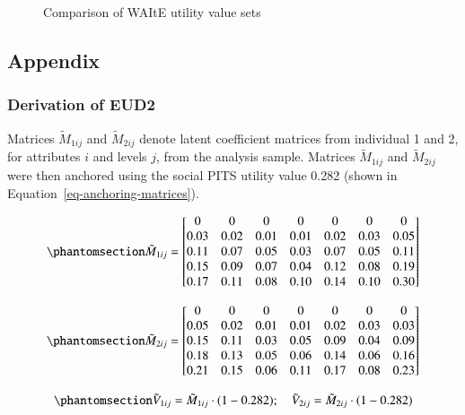\documentclass[
  number,
  preprint]{elsarticle}
\begin{document}
\begin{figure}
{}

\caption{\label{fig-WAItEvalsets}Comparison of WAItE utility value sets}

\end{figure}%

\subsection{Appendix}\label{appendix}

\subsubsection{Derivation of EUD2}\label{sec-appendix1}

Matrices \(\tilde{M}_{1ij}\) and \(\tilde{M}_{2ij}\) denote latent
coefficient matrices from individual 1 and 2, for attributes \(i\) and
levels \(j\), from the analysis sample. Matrices \(\tilde{M}_{1ij}\) and
\(\tilde{M}_{2ij}\) were then anchored using the social PITS utility
value 0.282 (shown in Equation~\ref{eq-anchoring-matrices}).

\begin{equation}\phantomsection\label{eq-coef-1}{
\tilde{M}_{1ij} =  
\begin{bmatrix}
0 & 0 & 0 & 0 & 0 & 0 & 0 \\
0.03 & 0.02 & 0.01 & 0.01 & 0.02 & 0.03 & 0.05 \\
0.11 & 0.07 & 0.05 & 0.03 & 0.07 & 0.05 & 0.11 \\
0.15 & 0.09 & 0.07 & 0.04 & 0.12 & 0.08 & 0.19 \\
0.17 & 0.11 & 0.08 & 0.10 & 0.14 & 0.10 & 0.30
\end{bmatrix}
}\end{equation}

\begin{equation}\phantomsection\label{eq-coef-2}{
\tilde{M}_{2ij} =  
\begin{bmatrix}
0 & 0 & 0 & 0 & 0 & 0 & 0 \\
0.05 & 0.02 & 0.01 & 0.01 & 0.02 & 0.03 & 0.03 \\
0.15 & 0.11 & 0.03 & 0.05 & 0.09 & 0.04 & 0.09 \\
0.18 & 0.13 & 0.05 & 0.06 & 0.14 & 0.06 & 0.16 \\
0.21 & 0.15 & 0.06 & 0.11 & 0.17 & 0.08 & 0.23
\end{bmatrix}
}\end{equation}

\begin{equation}\phantomsection\label{eq-anchoring-matrices}{
    \tilde{V}_{1ij} = \tilde{M}_{1ij} \cdot (1-0.282); \quad
    \tilde{V}_{2ij} = \tilde{M}_{2ij} \cdot (1-0.282)
}\end{equation}
\end{document}
